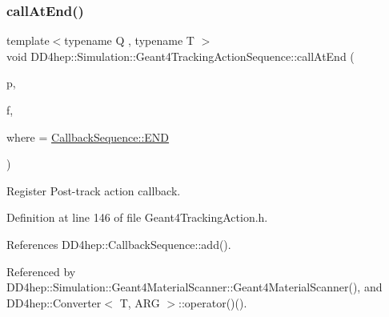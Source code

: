 \subsubsection{\texorpdfstring{call\+At\+End()}{callAtEnd()}}
{\footnotesize\ttfamily template$<$typename Q , typename T $>$ \\
void D\+D4hep\+::\+Simulation\+::\+Geant4\+Tracking\+Action\+Sequence\+::call\+At\+End (\begin{DoxyParamCaption}\item[{Q $\ast$}]{p,  }\item[{void(T\+::$\ast$)(const G4\+Track $\ast$)}]{f,  }\item[{\hyperlink{struct_d_d4hep_1_1_callback_sequence_a7753490247479633aed16a2376821ef7}{Callback\+Sequence\+::\+Location}}]{where = {\ttfamily \hyperlink{struct_d_d4hep_1_1_callback_sequence_a7753490247479633aed16a2376821ef7ac39eeb1bcfc1c235ab1d0d9315c310ac}{Callback\+Sequence\+::\+E\+ND}} }\end{DoxyParamCaption})\hspace{0.3cm}{\ttfamily [inline]}}



Register Post-\/track action callback. 



Definition at line 146 of file Geant4\+Tracking\+Action.\+h.



References D\+D4hep\+::\+Callback\+Sequence\+::add().



Referenced by D\+D4hep\+::\+Simulation\+::\+Geant4\+Material\+Scanner\+::\+Geant4\+Material\+Scanner(), and D\+D4hep\+::\+Converter$<$ T, A\+R\+G $>$\+::operator()().

\hypertarget{class_d_d4hep_1_1_simulation_1_1_geant4_tracking_action_sequence_a79391a6f41fad96a2b7af4e74b6b72a3}{}\label{class_d_d4hep_1_1_simulation_1_1_geant4_tracking_action_sequence_a79391a6f41fad96a2b7af4e74b6b72a3} 

